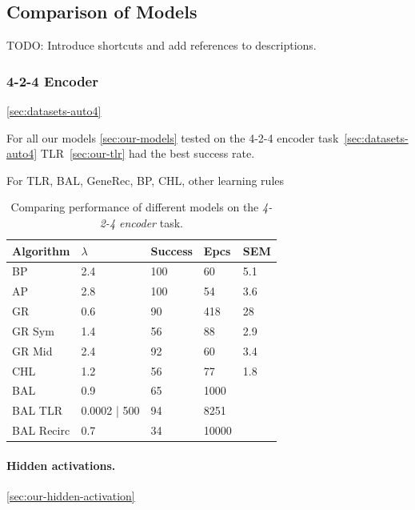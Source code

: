 
\subsection{Comparison of Models} 
\label{sec:results-comparison}

TODO: Introduce shortcuts and add references to descriptions. \\

\subsubsection{4-2-4 Encoder}
\ref{sec:datasets-auto4} 

For all our models \ref{sec:our-models} tested on the 4-2-4 encoder task~\ref{sec:datasets-auto4} TLR~\ref{sec:our-tlr} had the best success rate. 

For TLR, BAL, GeneRec, BP, CHL, other learning rules

\begin{table}
  \centering
    \begin{tabular}{|l|l|l|l|l|}
    \hline
    Algorithm&$\lambda$&Success&Epcs&SEM \\
    \hline
    BP&2.4&100&60&5.1\\
    \hline
    AP&2.8&100&54&3.6\\
    \hline
    GR&0.6&90&418&28\\
    \hline
    GR Sym&1.4&56&88&2.9\\
    \hline
    GR Mid&2.4&92&60&3.4\\
    \hline
    CHL&1.2&56&77&1.8\\
    \hline
    BAL&0.9&65&1000&\\
    \hline
    BAL TLR&0.0002 | 500&94&8251&\\
    \hline
    BAL Recirc&0.7&34&10000&\\
    \hline
    \end{tabular}
  \caption{Comparing performance of different models on the \emph{4-2-4 encoder} task.} 
  \label{tab:results-cmp-auto4}
\end{table}

\paragraph{Hidden activations.}
\ref{sec:our-hidden-activation}  


